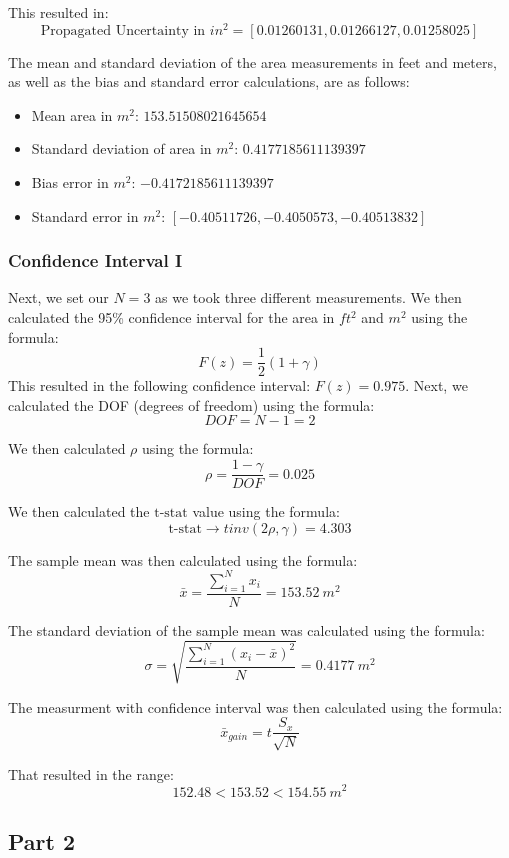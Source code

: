 \documentclass{article}
\begin{document}
This resulted in:
\[
\text{Propagated Uncertainty in } in^2 = \left[0.01260131, 0.01266127, 0.01258025\right]
\]

The mean and standard deviation of the area measurements in feet and meters, as well as the bias and standard error calculations, are as follows:

\begin{itemize}
	\item Mean area in \(m^2\): \(153.51508021645654\)
	\item Standard deviation of area in \(m^2\): \(0.4177185611139397\)
	\item Bias error in \(m^2\): \(-0.4172185611139397\)
	\item Standard error in \(m^2\): \([-0.40511726, -0.4050573, -0.40513832]\)
\end{itemize}

\subsubsection{Confidence Interval I}

Next, we set our \( N = 3\) as we took three different measurements. We then calculated the 95\% confidence interval for the area in \(ft^2\) and \(m^2\) using the formula:
\[
F(z) = \frac{1}{2}(1 + \gamma)
\]
This resulted in the following confidence interval: \( F(z) = 0.975 \). Next, we calculated the DOF (degrees of freedom) using the formula:
\[
DOF = N - 1 = 2
\]


We then calculated \(\rho\) using the formula:
\[
\rho = \frac{1 - \gamma}{DOF} = 0.025
\]


We then calculated the \(\text{t-stat}\) value using the formula:
\[
\text{t-stat} \rightarrow tinv{(2\rho, \gamma)} = 4.303
\]


The sample mean was then calculated using the formula:
\[
\bar{x} = \frac{\sum_{i=1}^{N} x_i}{N} = 153.52 \ m^2
\]


The standard deviation of the sample mean was calculated using the formula:
\[
  \sigma = \sqrt{\frac{\sum_{i = 1}^{N}(x_i - \bar{x})^2}{N}} = 0.4177 \ m^2
\]


The measurment with confidence interval was then calculated using the formula:
\[
  \bar{x}_{gain} = t\frac{S_x}{\sqrt{N}}
\]


That resulted in the range:
\[
  152.48 < 153.52 < 154.55 \ m^2
\]


\subsection{Part 2}
\end{document}
